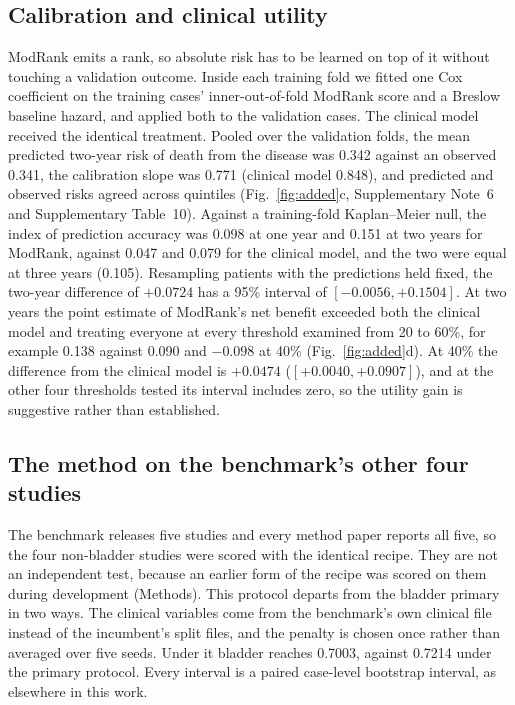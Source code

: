\documentclass[pdflatex,sn-nature]{sn-jnl}
\begin{document}
\subsection*{Calibration and clinical utility}

ModRank emits a rank, so absolute risk has to be learned on top of it without touching a validation
outcome. Inside each training fold we fitted one Cox coefficient on the training cases'
inner-out-of-fold ModRank score and a Breslow baseline hazard, and applied both to the validation
cases. The clinical model received the identical treatment. Pooled over the validation folds, the
mean predicted two-year risk of death from the disease was 0.342 against an observed 0.341, the
calibration slope was 0.771 (clinical model 0.848), and predicted and observed risks agreed across
quintiles (Fig.~\ref{fig:added}c, Supplementary Note~6 and Supplementary Table~10). Against a
training-fold Kaplan--Meier null, the index of
prediction accuracy was 0.098 at one year and 0.151 at two years for ModRank, against 0.047 and 0.079
for the clinical model, and the two were equal at three years (0.105). Resampling patients with the
predictions held fixed, the two-year difference of $+0.0724$ has a 95\% interval of
$[-0.0056, +0.1504]$. At two years the point estimate of ModRank's net benefit exceeded both the
clinical model and treating everyone at every threshold examined from 20 to 60\%, for example 0.138 against 0.090 and $-0.098$ at
40\% (Fig.~\ref{fig:added}d). At 40\% the difference from the clinical model is $+0.0474$
($[+0.0040, +0.0907]$), and at the other four thresholds tested its interval includes zero, so the
utility gain is suggestive rather than established.

\subsection*{The method on the benchmark's other four studies}

The benchmark releases five studies and every method paper reports all five, so the four
non-bladder studies were scored with the identical recipe. They are not an independent test, because
an earlier form of the recipe was scored on them during development (Methods).
This protocol departs from the bladder primary in two ways. The clinical variables come from the
benchmark's own clinical file instead of the incumbent's split files, and the penalty is chosen once
rather than averaged over five seeds. Under it bladder reaches 0.7003, against 0.7214 under the
primary protocol. Every interval is a paired case-level bootstrap interval, as elsewhere in this
work.
\end{document}
